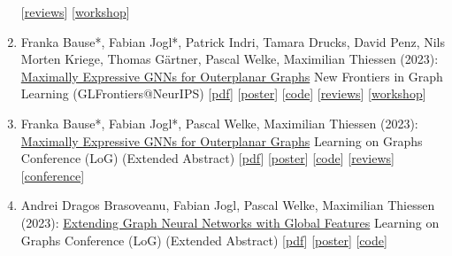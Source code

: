 \documentclass{scrartcl}
\begin{document}
\begin{enumerate}
{[\href{https://openreview.net/forum?id=lR5NYB9zrv}{reviews}]
[\href{https://glfrontiers.github.io/}{workshop}]
}
\item
\label{bausejogl2023outerplanarglfrontiers}
Franka Bause*, Fabian Jogl*, Patrick Indri, Tamara Drucks, David Penz, Nils Morten Kriege, Thomas Gärtner, Pascal Welke, Maximilian Thiessen (2023):\newline
\href{https://openreview.net/pdf?id=dn87xnULwF}{Maximally Expressive GNNs for Outerplanar Graphs}\newline
New Frontiers in Graph Learning (GLFrontiers@NeurIPS)\newline
{\footnotesize
[\href{https://pwelke.github.io/publications/bause2023outerplanarglfroniers.pdf}{pdf}]
[\href{https://pwelke.github.io/publications/bause2023outerplanar-poster.pdf}{poster}]
[\href{https://github.com/ocatias/outerplanarGNNs/}{code}]
[\href{https://openreview.net/forum?id=gXCqzpvhuD}{reviews}]
[\href{https://glfrontiers.github.io/}{workshop}]
}
\item
\label{bausejogl2023outerplanarlog}
Franka Bause*, Fabian Jogl*, Pascal Welke, Maximilian Thiessen (2023):\newline
\href{https://openreview.net/forum?id=7vyGCFTajk}{Maximally Expressive GNNs for Outerplanar Graphs}\newline
Learning on Graphs Conference (LoG)\newline
(Extended Abstract)\newline
{\footnotesize
[\href{https://pwelke.github.io/publications/bause2023outerplanarlog.pdf}{pdf}]
[\href{https://pwelke.github.io/publications/bause2023outerplanar-poster.pdf}{poster}]
[\href{https://github.com/ocatias/OuterplanarGNNs_LoG}{code}]
[\href{https://openreview.net/forum?id=7vyGCFTajk}{reviews}]
[\href{https://logconference.org}{conference}]
}
\item
\label{brasoveanu2023gnnglobalfeatures}
Andrei Dragos Brasoveanu, Fabian Jogl, Pascal Welke, Maximilian Thiessen (2023):\newline
\href{https://openreview.net/forum?id=aisVQy6R2k}{Extending Graph Neural Networks with Global Features}\newline
Learning on Graphs Conference (LoG)\newline
(Extended Abstract)\newline
{\footnotesize
[\href{https://pwelke.github.io/publications/brasoveanu2023global.pdf}{pdf}]
[\href{https://pwelke.github.io/publications/brasoveanu2023global-poster.pdf}{poster}]
[\href{https://github.com/andreibrasoveanu97/gnn-global-features}{code}]
}
\end{enumerate}
\end{document}

